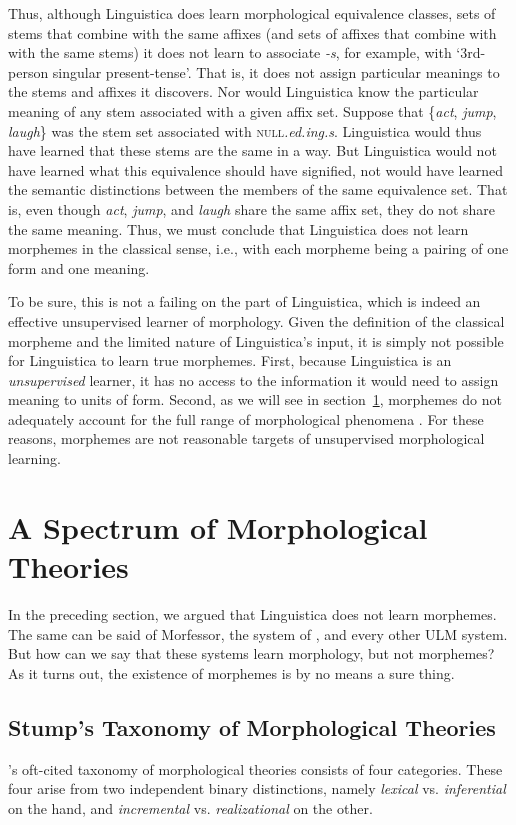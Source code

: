 Thus, although Linguistica does learn morphological equivalence classes, 
sets of stems that combine with the same affixes 
(and sets of affixes that combine with with the same stems) 
it does not learn to associate \textit{-s}, for example, 
with `3rd-person singular present-tense'. That is, it does not assign particular
meanings to the stems and affixes it discovers.
Nor would Linguistica know the particular meaning of any stem 
associated with a given affix set. 
Suppose that \{\textit{act}, \emph{jump}, \emph{laugh}\} 
was the stem set associated with \textsc{null}\textit{.ed.ing.s}. 
Linguistica would thus have learned that these stems are the same 
in a way. But Linguistica would not have learned what this 
equivalence should have signified, not would have learned the semantic 
distinctions between the members of the same equivalence set. 
That is, even though \textit{act}, \emph{jump}, and \emph{laugh} 
share the same affix set, they do not share the same meaning. 
Thus, we must conclude that Linguistica does not learn morphemes 
in the classical sense, i.e., with each morpheme being a
pairing of one form and one meaning.

To be sure, this is not a failing on the 
part of Linguistica, which is indeed an effective 
unsupervised learner of morphology. Given the definition 
of the classical morpheme and the limited nature of 
Linguistica's input, it is simply not possible for 
Linguistica to learn true morphemes. First, because 
Linguistica is an \emph{unsupervised} learner, it has 
no access to the information it would need to assign meaning to units of form.
Second, as we will see in section~\ref{sec:morpho-theories}, morphemes do not adequately 
account for the full range of morphological phenomena \citep{anderson:2017}. 
For these reasons, morphemes are not reasonable 
targets of unsupervised morphological learning.

\section{A Spectrum of Morphological Theories}
\label{sec:morpho-theories}
In the preceding section, we argued that Linguistica does not learn morphemes. The same can be said of Morfessor, 
the system of \cite{poon-et-al:2009}, and
every other \ac{ULM}  system.
 But how can we say that these systems learn morphology, but not morphemes? As it turns out,
 the existence of morphemes is by no means a sure thing.  

\subsection{Stump's Taxonomy of Morphological Theories}
\cite{stump:2001}'s oft-cited taxonomy of morphological theories 
consists of four categories. These four arise from two independent 
binary distinctions, namely \emph{lexical} vs. \emph{inferential} on the hand, and \emph{incremental} vs. \emph{realizational} on the other.
 
